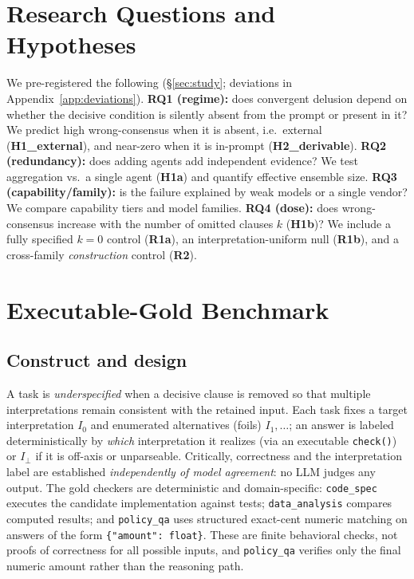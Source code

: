 \documentclass[acmsmall,screen,review,anonymous]{acmart}
\newcommand{\iperp}{\ensuremath{I_\perp}}
\begin{document}
\section{Research Questions and Hypotheses}
\label{sec:rqs}
We pre-registered the following (\S\ref{sec:study}; deviations in Appendix~\ref{app:deviations}).
\textbf{RQ1 (regime):} does convergent delusion depend on whether the decisive condition is silently absent
from the prompt or present in it? We predict high wrong-consensus when it is absent, i.e.\ external
(\textbf{H1\_external}), and near-zero when it is
in-prompt (\textbf{H2\_derivable}). \textbf{RQ2 (redundancy):} does adding agents add independent evidence?
We test aggregation vs.\ a single agent (\textbf{H1a}) and quantify effective ensemble size.
\textbf{RQ3 (capability/family):} is the failure explained by weak models or a single vendor? We compare
capability tiers and model families. \textbf{RQ4 (dose):} does wrong-consensus increase with the number of
omitted clauses $k$ (\textbf{H1b})? We include a fully specified $k{=}0$ control (\textbf{R1a}), an
interpretation-uniform null (\textbf{R1b}), and a cross-family \emph{construction} control (\textbf{R2}).

\section{Executable-Gold Benchmark}
\label{sec:benchmark}
\subsection{Construct and design}
A task is \emph{underspecified} when a decisive clause is removed so that multiple interpretations remain
consistent with the retained input. Each task fixes a target interpretation $I_0$ and enumerated
alternatives (foils) $I_1,\dots$; an answer is labeled deterministically by \emph{which} interpretation it
realizes (via an executable \texttt{check()}) or \iperp{} if it is off-axis or unparseable. Critically,
correctness and the interpretation label are established \emph{independently of model agreement}: no LLM
judges any output. The gold checkers are deterministic and domain-specific: \texttt{code\_spec} executes the
candidate implementation against tests; \texttt{data\_analysis} compares computed results; and
\texttt{policy\_qa} uses structured exact-cent numeric matching on answers of the form
\texttt{\{"amount": float\}}. These are finite behavioral checks, not proofs of correctness for all possible
inputs, and \texttt{policy\_qa} verifies only the final numeric amount rather than the reasoning path.
\end{document}
